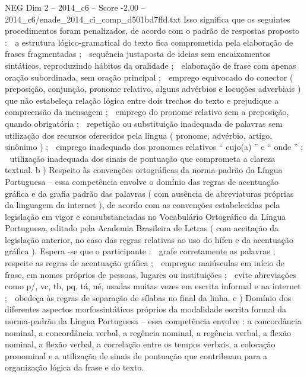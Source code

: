 \begin{textsample}{NEG Dim 2 – 2014\_c6 – Score -2.00 – 2014\_c6/enade\_2014\_ci\_comp\_d501bd7ffd.txt}
Isso significa que os seguintes procedimentos foram penalizados, de acordo com o padrão de respostas proposto :  a estrutura lógico-gramatical do texto fica comprometida pela elaboração de frases fragmentadas ;  sequência justaposta de ideias sem encaixamentos sintáticos, reproduzindo hábitos da oralidade ;  elaboração de frase com apenas oração subordinada, sem oração principal ;  emprego equivocado do conector ( preposição, conjunção, pronome relativo, alguns advérbios e locuções adverbiais ) que não estabeleça relação lógica entre dois trechos do texto e prejudique a compreensão da mensagem ;  emprego do pronome relativo sem a preposição, quando obrigatória ;  repetição ou substituição inadequada de palavras sem utilização dos recursos oferecidos pela língua ( pronome, advérbio, artigo, sinônimo ) ;  emprego inadequado dos pronomes relativos “ cujo(a) ” e “ onde ” ;  utilização inadequada dos sinais de pontuação que comprometa a clareza textual. b ) Respeito às convenções ortográficas da norma-padrão da Língua Portuguesa – essa competência envolve o domínio das regras de acentuação gráfica e da grafia padrão das palavras ( com ausência de abreviaturas próprias da linguagem da internet ), de acordo com as convenções estabelecidas pela legislação em vigor e consubstanciadas no Vocabulário Ortográfico da Língua Portuguesa, editado pela Academia Brasileira de Letras ( com aceitação da legislação anterior, no caso das regras relativas ao uso do hífen e da acentuação gráfica ).
Espera -se que o participante :  grafe corretamente as palavras ;  respeite as regras de acentuação gráfica ;  empregue maiúsculas em início de frase, em nomes próprios de pessoas, lugares ou instituições ;  evite abreviações como p/, vc, tb, pq, tá, né, usadas muitas vezes em escrita informal e na internet ;  obedeça às regras de separação de sílabas no final da linha. c ) Domínio dos diferentes aspectos morfossintáticos próprios da modalidade escrita formal da norma-padrão da Língua Portuguesa – essa competência envolve : a concordância nominal, a concordância verbal, a regência nominal, a regência verbal, a flexão nominal, a flexão verbal, a correlação entre os tempos verbais, a colocação pronominal e a utilização de sinais de pontuação que contribuam para a organização lógica da frase e do texto.

\end{textsample}
